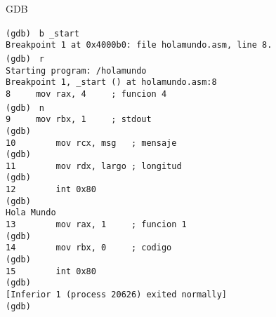 \documentclass[aspectratio=169]{beamer}
\begin{document}
\begin{frame}[fragile,t]{GDB}
    \hspace{3cm}
    \begin{minipage}{10cm}
    \vspace{-0.5cm}
    \scriptsize
    \verb|(gdb) | \pause \verb|b _start|\\ \pause
    \verb|Breakpoint 1 at 0x4000b0: file holamundo.asm, line 8.|\\
    \verb|(gdb) | \pause \verb|r|\\ \pause
    \verb|Starting program: /holamundo |\\
    \verb|Breakpoint 1, _start () at holamundo.asm:8   |\\
    \verb|8	    mov rax, 4     ; funcion 4             |\\
    \verb|(gdb) | \pause \verb|n|\\ \pause
    \verb|9	    mov rbx, 1     ; stdout                |\\
    \verb|(gdb) | \pause \\ 
    \verb|10	    mov rcx, msg   ; mensaje           |\\
    \verb|(gdb) | \pause \\ 
    \verb|11	    mov rdx, largo ; longitud          |\\
    \verb|(gdb) | \pause \\ 
    \verb|12	    int 0x80                           |\\
    \verb|(gdb) | \pause \\ 
    \verb|Hola Mundo                                   |\\
    \verb|13	    mov rax, 1     ; funcion 1         |\\
    \verb|(gdb) | \pause \\ 
    \verb|14	    mov rbx, 0     ; codigo            |\\
    \verb|(gdb) | \pause \\ 
    \verb|15	    int 0x80                           |\\
    \verb|(gdb) | \pause \\ 
    \verb|[Inferior 1 (process 20626) exited normally] |\\
    \verb|(gdb)                                        |\\
    \end{minipage}
\end{frame}
\end{document}
